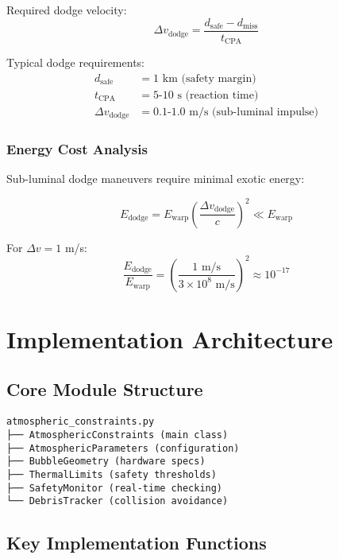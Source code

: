 \documentclass[12pt,a4paper]{article}
\begin{document}
Required dodge velocity:
\begin{equation}
\Delta v_{\text{dodge}} = \frac{d_{\text{safe}} - d_{\text{miss}}}{t_{\text{CPA}}}
\end{equation}

Typical dodge requirements:
\begin{align}
d_{\text{safe}} &= 1 \text{ km (safety margin)} \\
t_{\text{CPA}} &= 5\text{-}10 \text{ s (reaction time)} \\
\Delta v_{\text{dodge}} &= 0.1\text{-}1.0 \text{ m/s (sub-luminal impulse)}
\end{align}

\subsubsection{Energy Cost Analysis}

Sub-luminal dodge maneuvers require minimal exotic energy:

\begin{equation}
E_{\text{dodge}} = E_{\text{warp}} \left(\frac{\Delta v_{\text{dodge}}}{c}\right)^2 \ll E_{\text{warp}}
\end{equation}

For $\Delta v = 1$ m/s:
\begin{equation}
\frac{E_{\text{dodge}}}{E_{\text{warp}}} = \left(\frac{1 \text{ m/s}}{3 \times 10^8 \text{ m/s}}\right)^2 \approx 10^{-17}
\end{equation}

\section{Implementation Architecture}

\subsection{Core Module Structure}

\begin{verbatim}
atmospheric_constraints.py
├── AtmosphericConstraints (main class)
├── AtmosphericParameters (configuration)
├── BubbleGeometry (hardware specs)
├── ThermalLimits (safety thresholds)
├── SafetyMonitor (real-time checking)
└── DebrisTracker (collision avoidance)
\end{verbatim}

\subsection{Key Implementation Functions}
\end{document}
